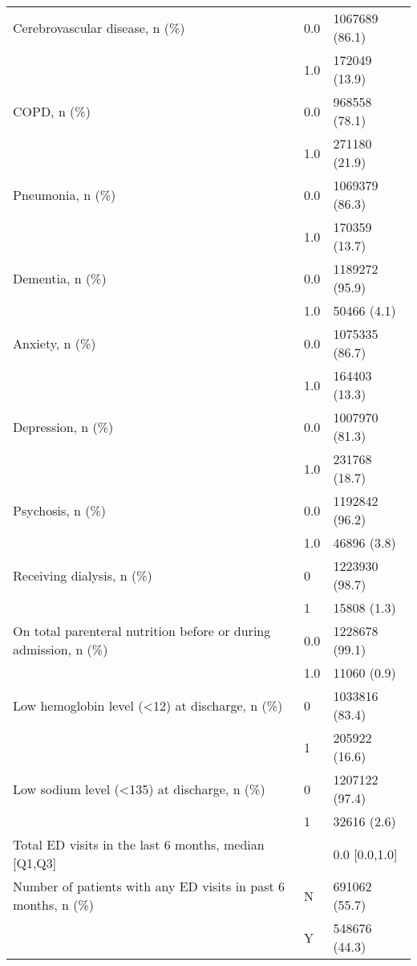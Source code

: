 \begin{tabular}{lll}
Cerebrovascular disease, n (\%) & 0.0 &     1067689 (86.1) \\
                                       & 1.0 &      172049 (13.9) \\
COPD, n (\%) & 0.0 &      968558 (78.1) \\
                                       & 1.0 &      271180 (21.9) \\
Pneumonia, n (\%) & 0.0 &     1069379 (86.3) \\
                                       & 1.0 &      170359 (13.7) \\
Dementia, n (\%) & 0.0 &     1189272 (95.9) \\
                                       & 1.0 &        50466 (4.1) \\
Anxiety, n (\%) & 0.0 &     1075335 (86.7) \\
                                       & 1.0 &      164403 (13.3) \\
Depression, n (\%) & 0.0 &     1007970 (81.3) \\
                                       & 1.0 &      231768 (18.7) \\
Psychosis, n (\%) & 0.0 &     1192842 (96.2) \\
                                       & 1.0 &        46896 (3.8) \\
Receiving dialysis, n (\%) & 0 &     1223930 (98.7) \\
                                       & 1 &        15808 (1.3) \\
On total parenteral nutrition before or during admission, n (\%) & 0.0 &     1228678 (99.1) \\
                                       & 1.0 &        11060 (0.9) \\
Low hemoglobin level (<12) at discharge, n (\%) & 0 &     1033816 (83.4) \\
                                       & 1 &      205922 (16.6) \\
Low sodium level (<135) at discharge, n (\%) & 0 &     1207122 (97.4) \\
                                       & 1 &        32616 (2.6) \\
Total ED visits in the last 6 months, median [Q1,Q3] &   &      0.0 [0.0,1.0] \\
Number of patients with any ED visits in past 6 months, n (\%) & N &      691062 (55.7) \\
                                       & Y &      548676 (44.3) \\

\end{tabular}
